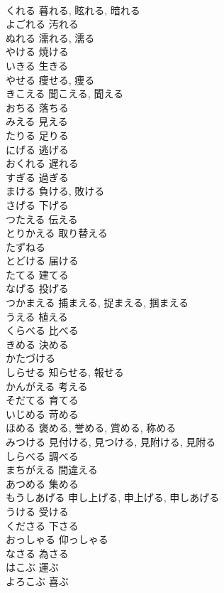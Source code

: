 \documentclass[8pt]{extreport}
\begin{document}
\begin{CJK}{UTF8}{min}
\\	くれる	暮れる, 眩れる, 暗れる
\\	よごれる	汚れる
\\	ぬれる	濡れる, 濡る
\\	やける	焼ける
\\	いきる	生きる
\\	やせる	痩せる, 痩る
\\	きこえる	聞こえる, 聞える
\\	おちる	落ちる
\\	みえる	見える
\\	たりる	足りる
\\	にげる	逃げる
\\	おくれる	遅れる
\\	すぎる	過ぎる
\\	まける	負ける, 敗ける
\\	さげる	下げる
\\	つたえる	伝える
\\	とりかえる	取り替える
\\	たずねる	
\\	とどける	届ける
\\	たてる	建てる
\\	なげる	投げる
\\	つかまえる	捕まえる, 捉まえる, 掴まえる
\\	うえる	植える
\\	くらべる	比べる
\\	きめる	決める
\\	かたづける	
\\	しらせる	知らせる, 報せる
\\	かんがえる	考える
\\	そだてる	育てる
\\	いじめる	苛める
\\	ほめる	褒める, 誉める, 賞める, 称める
\\	みつける	見付ける, 見つける, 見附ける, 見附る
\\	しらべる	調べる
\\	まちがえる	間違える
\\	あつめる	集める
\\	もうしあげる	申し上げる, 申上げる, 申しあげる
\\	うける	受ける
\\	くださる	下さる
\\	おっしゃる	仰っしゃる
\\	なさる	為さる
\\	はこぶ	運ぶ
\\	よろこぶ	喜ぶ

\end{CJK}
\end{document}
